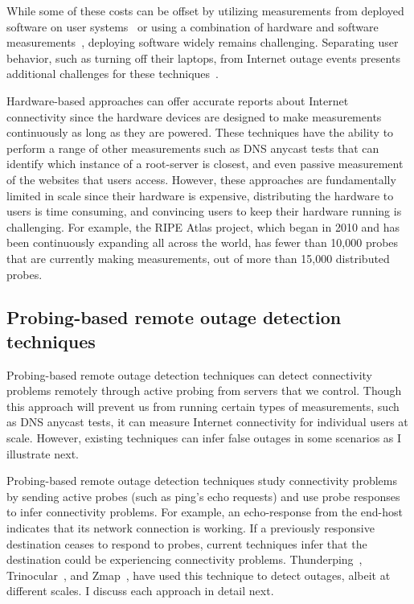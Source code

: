 While some of these costs can be offset by utilizing measurements from
deployed software on user systems~\cite{netdimes, dhcp-dimes, Dasu:NSDI2013} or using a combination of hardware
and software measurements~\cite{IMC2014-Broadband-bischof}, deploying software widely remains
challenging. Separating user behavior, such as turning off their laptops, from
Internet outage events presents additional challenges for these techniques~\cite{dhcp-dimes}.


Hardware-based approaches can offer accurate reports about
Internet connectivity since the hardware devices are designed to make
measurements continuously as long as they are powered. These techniques have the
ability to perform a range of other measurements such as DNS anycast
tests that can identify which instance of a root-server is closest,
and even passive measurement of the websites that users
access. However, these approaches are fundamentally limited in scale
since their hardware is expensive, distributing the hardware to users
is time consuming, and convincing users to keep their hardware running
is challenging. For example, the RIPE Atlas project, which began in
2010 and has been continuously expanding all across the world, has fewer than 10,000 probes that are currently making measurements, out
of more than 15,000 distributed probes.
 
\subsection{Probing-based remote outage detection techniques}


Probing-based remote outage detection techniques can detect
connectivity problems remotely through active probing from servers
that we control. Though this approach will prevent us from running
certain types of measurements, such as DNS anycast tests, it can measure
Internet connectivity for individual users at scale. However,
existing techniques can infer false outages in some scenarios as I
illustrate next.

Probing-based remote outage detection techniques study connectivity problems by
sending active probes (such as ping's echo requests) and use probe
responses to infer connectivity problems. For example, an
echo-response from the end-host indicates that its network connection
is working. If a previously responsive destination ceases to respond
to probes, current techniques infer that the destination could be
experiencing connectivity problems. Thunderping~\cite{pingin},
Trinocular~\cite{trinocular}, and Zmap~\cite{durumeric2013zmap}, have
used this technique to detect outages, albeit at different scales. I
discuss each approach in detail next.

